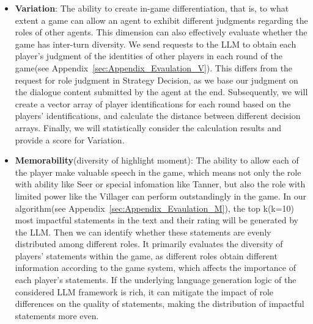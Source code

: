 \begin{itemize}
  \item \textbf{Variation}: The ability to create in-game differentiation, that is, to what extent a game can allow an agent to exhibit different judgments regarding the roles of other agents. This dimension can also effectively evaluate whether the game has inter-turn diversity. We send requests to the LLM to obtain each player's judgment of the identities of other players in each round of the game(see Appendix~\ref{sec:Appendix_Evaulation_V}). This differs from the request for role judgment in Strategy Decision, as we base our judgment on the dialogue content submitted by the agent at the end. Subsequently, we will create a vector array of player identifications for each round based on the players' identifications, and calculate the distance between different decision arrays. Finally, we will statistically consider the calculation results and provide a score for Variation.
 
  \item \textbf{Memorability}(diversity of highlight moment): The ability to allow each of the player make valuable speech in the game, which means not only the role with ability like Seer or special infomation like Tanner, but also the role with limited power like the Villager can perform outstandingly in the game. In our algorithm(see Appendix~\ref{sec:Appendix_Evaulation_M}), the top k(k=10) most impactful statements in the text and their rating will be generated by the LLM. Then we can identify whether these statements are evenly distributed among different roles. It primarily evaluates the diversity of players' statements within the game, as different roles obtain different information according to the game system, which affects the importance of each player's statements. If the underlying language generation logic of the considered LLM framework is rich, it can mitigate the impact of role differences on the quality of statements, making the distribution of impactful statements more even.
  
  
\end{itemize}

